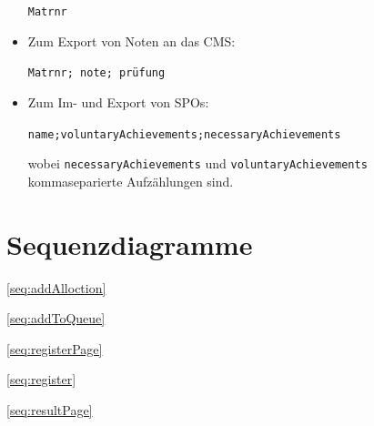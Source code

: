 \documentclass[parskip=full]{scrartcl}
\begin{document}
\begin{itemize}
   \begin{tcolorbox}[enhanced jigsaw,
 colback=testgrauRGB, %
 coltext=black, %
 sharp corners, %
 colframe=black, %
 boxrule=0pt %
 ]
 \texttt{Matrnr}
  \end{tcolorbox}
   \item Zum Export von Noten an das CMS: \\ \begin{tcolorbox}[enhanced
  jigsaw,
 colback=testgrauRGB, %
 coltext=black, %
 sharp corners, %
 colframe=black, %
 boxrule=0pt %
 ]
 \texttt{Matrnr; note; prüfung}
  \end{tcolorbox}
     \item Zum Im- und Export von SPOs: \\ \begin{tcolorbox}[enhanced
  jigsaw,
 colback=testgrauRGB, %
 coltext=black, %
 sharp corners, %
 colframe=black, %
 boxrule=0pt %
 ]
 \texttt{name;voluntaryAchievements;necessaryAchievements}
  \end{tcolorbox}
  wobei \texttt{necessaryAchievements} und \texttt{voluntaryAchievements}
  kommaseparierte Aufzählungen sind.
\end{itemize}




\section{Sequenzdiagramme}
\autoref{seq:addAlloction}

\autoref{seq:addToQueue}

\autoref{seq:registerPage}

\autoref{seq:register}

\autoref{seq:resultPage}




 
\end{document}
